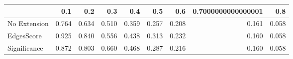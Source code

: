 \begin{tabular}{lrrrrrrrr}
\toprule
{} &   0.1 &   0.2 &   0.3 &   0.4 &   0.5 &   0.6 & 0.7000000000000001 &   0.8 \\
\midrule
No Extension & 0.764 & 0.634 & 0.510 & 0.359 & 0.257 & 0.208 &              0.161 & 0.058 \\
EdgesScore   & 0.925 & 0.840 & 0.556 & 0.438 & 0.313 & 0.232 &              0.160 & 0.058 \\
Significance & 0.872 & 0.803 & 0.660 & 0.468 & 0.287 & 0.216 &              0.160 & 0.058 \\
\bottomrule
\end{tabular}
